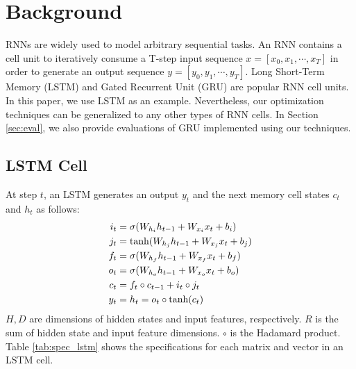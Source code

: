 \section{Background}
\label{sec:back}
RNNs are widely used to model arbitrary sequential tasks.
An RNN contains a cell unit to iteratively consume
  a T-step input sequence $x = [x_0, x_1, \cdots, x_T]$
  in order to generate an output sequence $y = [y_0, y_1, \cdots, y_T]$.
Long Short-Term Memory (LSTM) \cite{hochreiter1997long}
  and Gated Recurrent Unit (GRU) \cite{chung2014empirical}
  are popular RNN cell units.
In this paper, we use LSTM as an example.
Nevertheless, our optimization techniques can be generalized to any other types of RNN cells.
In Section \ref{sec:eval},
  we also provide evaluations of GRU implemented using our techniques.

\subsection{LSTM Cell}
At step $t$, an LSTM generates an
  output $y_t$ and the next memory cell states $c_t$ and $h_t$ as follows:
  \begin{align}
    \centering
    i_t &= \sigma (W_{h_i} h_{t-1} + W_{x_i} x_t + b_i) \label{eq:1} \\
    j_t &= \tanh (W_{h_j} h_{t-1} + W_{x_j} x_t + b_j) \label{eq:2} \\
    f_t &= \sigma (W_{h_f} h_{t-1} + W_{x_f} x_t + b_f) \label{eq:3} \\
    o_t &= \sigma (W_{h_o} h_{t-1} + W_{x_o} x_t + b_o)\label{eq:4} \\
    c_t &= f_t \circ c_{t-1} + i_t \circ j_t \label{eq:5} \\
    y_t &= h_t = o_t \circ \tanh (c_t) \label{eq:6}
  \end{align}
$H, D$ are dimensions of hidden states and input features, respectively.
$R$ is the sum of hidden state and input feature dimensions.
$\circ$ is the Hadamard product.
Table \ref{tab:spec_lstm} shows the specifications for each matrix and vector in an LSTM cell.

